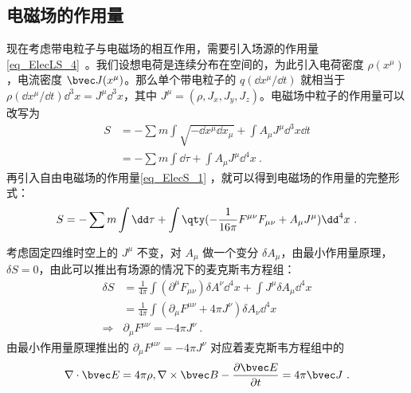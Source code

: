\subsection{电磁场的作用量}
现在考虑带电粒子与电磁场的相互作用，需要引入场源的作用量\autoref{eq_ElecLS_4}~。我们设想电荷是连续分布在空间的，为此引入电荷密度 $\rho(x^\mu)$，电流密度 $\bvec J(x^\mu)$。那么单个带电粒子的 $q(\dd x^\mu/\dd t)$ 就相当于 $\rho (\dd x^\mu / \dd t) {\dd} ^3 x=J^\mu {\dd}^3 x$，其中 $J^\mu=(\rho,J_x,J_y,J_z)$。电磁场中粒子的作用量可以改写为
\begin{equation}
\begin{aligned}
S&=-\sum{m\int \sqrt{-\dd x^\mu \dd x_\mu}}+\int A_\mu J^\mu {\dd}^3 x\dd t\\
&=-\sum{m\int \dd \tau}+\int A_\mu J^\mu {\dd}^4 x~.
\end{aligned}
\end{equation}
再引入自由电磁场的作用量\autoref{eq_ElecS_1} ，就可以得到电磁场的作用量的完整形式：
\begin{equation}\label{eq_ElecS_2}
S=-\sum{m\int \dd \tau}+\int \qty(-\frac{1}{16\pi}F^{\mu\nu}F_{\mu\nu}+A_\mu J^\mu ){\dd}^4 x~.
\end{equation}

考虑固定四维时空上的 $J^\mu$ 不变，对 $A_\mu$ 做一个变分 $\delta A_\mu$，由最小作用量原理，$\delta S=0$，由此可以推出有场源的情况下的麦克斯韦方程组：
\begin{equation}
\begin{aligned}
\delta S&=\frac{1}{4\pi}\int (\partial^\mu F_{\mu\nu})\delta A^\nu {\dd}^4 x +\int J^\mu \delta A_\mu {\dd}^4 x\\
&=\frac{1}{4\pi}\int (\partial_\mu F^{\mu\nu}+4\pi J^\nu)\delta A_\nu {\dd}^4 x\\
\Rightarrow &\partial_\mu F^{\mu\nu}=-4\pi J^\nu~.
\end{aligned}
\end{equation}
由最小作用量原理推出的 $\partial_\mu F^{\mu\nu}=-4\pi J^\nu$ 对应着麦克斯韦方程组中的
\begin{equation}
\nabla \cdot \bvec E=4\pi \rho,\nabla\times \bvec B-\frac{\partial \bvec E}{\partial t}=4\pi \bvec J~.
\end{equation}
